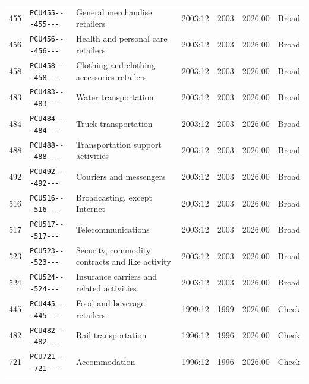 \begin{longtable}{llp{4.5cm}cccc}
  455 & \texttt{PCU455{-}{-}{-}455{-}{-}{-}} & General merchandise retailers & 2003:12 & 2003 & 2026.00 & Broad \\ 
  456 & \texttt{PCU456{-}{-}{-}456{-}{-}{-}} & Health and personal care retailers & 2003:12 & 2003 & 2026.00 & Broad \\ 
  458 & \texttt{PCU458{-}{-}{-}458{-}{-}{-}} & Clothing and clothing accessories retailers & 2003:12 & 2003 & 2026.00 & Broad \\ 
  483 & \texttt{PCU483{-}{-}{-}483{-}{-}{-}} & Water transportation & 2003:12 & 2003 & 2026.00 & Broad \\ 
  484 & \texttt{PCU484{-}{-}{-}484{-}{-}{-}} & Truck transportation & 2003:12 & 2003 & 2026.00 & Broad \\ 
  488 & \texttt{PCU488{-}{-}{-}488{-}{-}{-}} & Transportation support activities & 2003:12 & 2003 & 2026.00 & Broad \\ 
  492 & \texttt{PCU492{-}{-}{-}492{-}{-}{-}} & Couriers and messengers & 2003:12 & 2003 & 2026.00 & Broad \\ 
  516 & \texttt{PCU516{-}{-}{-}516{-}{-}{-}} & Broadcasting, except Internet & 2003:12 & 2003 & 2026.00 & Broad \\ 
  517 & \texttt{PCU517{-}{-}{-}517{-}{-}{-}} & Telecommunications & 2003:12 & 2003 & 2026.00 & Broad \\ 
  523 & \texttt{PCU523{-}{-}{-}523{-}{-}{-}} & Security, commodity contracts and like activity & 2003:12 & 2003 & 2026.00 & Broad \\ 
  524 & \texttt{PCU524{-}{-}{-}524{-}{-}{-}} & Insurance carriers and related activities & 2003:12 & 2003 & 2026.00 & Broad \\ 
  445 & \texttt{PCU445{-}{-}{-}445{-}{-}{-}} & Food and beverage retailers & 1999:12 & 1999 & 2026.00 & Check \\ 
  482 & \texttt{PCU482{-}{-}{-}482{-}{-}{-}} & Rail transportation & 1996:12 & 1996 & 2026.00 & Check \\ 
  721 & \texttt{PCU721{-}{-}{-}721{-}{-}{-}} & Accommodation & 1996:12 & 1996 & 2026.00 & Check \\ 
   \hline
\hline
\label{tab:ppi_roster}
\end{longtable}
